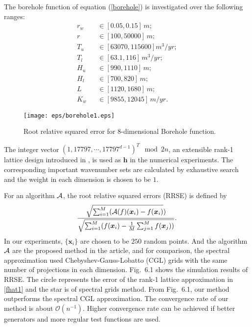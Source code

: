 \documentclass[article]{siamltex}
\def\bx{\boldsymbol x}
\def\bh{{\boldsymbol h}}
\begin{document}
 The borehole function of equation (\ref{borehole}) is
investigated over the following ranges:
 \begin{eqnarray*}r_w &
&\in [0.05, 0.15]\, m;\\ r && \in [100, 50000]\, m;\\ T_u && \in
[63070, 115600] m^3/yr;\\ T_l &&\in [63.1, 116] \, m^3/yr;\\ H_u
&&\in
[990, 1110]\, m;\\ H_l &&\in [700, 820]\, m ;\\L &&\in [1120, 1680] \,m;\\
K_w &&\in [9855, 12045] \, m/yr.
\end{eqnarray*}

\begin{figure}[ht]
\begin{center}
\texttt{[image: eps/borehole1.eps]}
\caption{Root relative squared  error for $8$-dimensional Borehole function.}
\end{center}
\end{figure}

 The integer vector  $(1 ,17797,\cdots,17797^{d-1} )^T \mod 2n $, an extensible rank-1 lattice design introduced in  \cite{HicHong2000},
is used  as $\bh$ in the numerical experiments. The corresponding important wavenumber sets are calculated by exhaustive search  and the weight in each dimension is chosen to be $1$. 

For an algorithm ${\cal A}$, the root relative squared errors (RRSE) is defined by
$$\frac{\sqrt{\sum_{i=1}^M ({\cal A}(f)(\bx_i)-f(\bx_i)})}{\sqrt{\sum_{i=1}^M (f(\bx_i)-\frac{1}{M}\sum_{j=1}^M f(\bx_j)) }}.$$ 
In our experiments, $\{\bx_i\}$ are chosen to be $250$ random  points. And the algorithm ${\cal A}$ are the proposed method in the article, and for comparison, the spectral approximation used Chebyshev-Gauss-Lobatto (CGL) grids  with  the same number of projections in each dimension.
Fig.~6.1 shows the simulation results of RRSE. The
circle represents the error of the rank-1 lattice approximation
in \eqref{fhat1} and the star is of spectral grids method. From Fig.~6.1, our method outperforms the spectral CGL approximation. The convergence rate of our method is about
$\mathcal{O}(n^{-1}).$ Higher convergence rate can be achieved  if
better generators and more regular test functions are used.
 \clearpage





\end{document}
